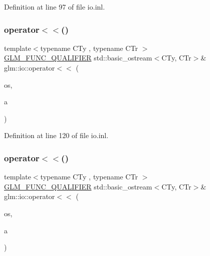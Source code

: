 Definition at line 97 of file io.\+inl.

\mbox{\label{namespaceglm_1_1io_ac52a8c5f8ea189f5bae2e5b8e382675f}} 
\subsubsection{\texorpdfstring{operator$<$$<$()}{operator<<()}\hspace{0.1cm}{\footnotesize\ttfamily [1/8]}}
{\footnotesize\ttfamily template$<$typename C\+Ty , typename C\+Tr $>$ \\
\mbox{\hyperlink{setup_8hpp_a33fdea6f91c5f834105f7415e2a64407}{G\+L\+M\+\_\+\+F\+U\+N\+C\+\_\+\+Q\+U\+A\+L\+I\+F\+I\+ER}} std\+::basic\+\_\+ostream$<$C\+Ty, C\+Tr$>$\& glm\+::io\+::operator$<$$<$ (\begin{DoxyParamCaption}\item[{std\+::basic\+\_\+ostream$<$ C\+Ty, C\+Tr $>$ \&}]{os,  }\item[{\mbox{\hyperlink{structglm_1_1io_1_1precision}{precision}} const \&}]{a }\end{DoxyParamCaption})}



Definition at line 120 of file io.\+inl.

\mbox{\label{namespaceglm_1_1io_ac4783e4e3b0384619625d5d2d00c27b8}} 
\subsubsection{\texorpdfstring{operator$<$$<$()}{operator<<()}\hspace{0.1cm}{\footnotesize\ttfamily [2/8]}}
{\footnotesize\ttfamily template$<$typename C\+Ty , typename C\+Tr $>$ \\
\mbox{\hyperlink{setup_8hpp_a33fdea6f91c5f834105f7415e2a64407}{G\+L\+M\+\_\+\+F\+U\+N\+C\+\_\+\+Q\+U\+A\+L\+I\+F\+I\+ER}} std\+::basic\+\_\+ostream$<$C\+Ty, C\+Tr$>$\& glm\+::io\+::operator$<$$<$ (\begin{DoxyParamCaption}\item[{std\+::basic\+\_\+ostream$<$ C\+Ty, C\+Tr $>$ \&}]{os,  }\item[{\mbox{\hyperlink{structglm_1_1io_1_1width}{width}} const \&}]{a }\end{DoxyParamCaption})}



